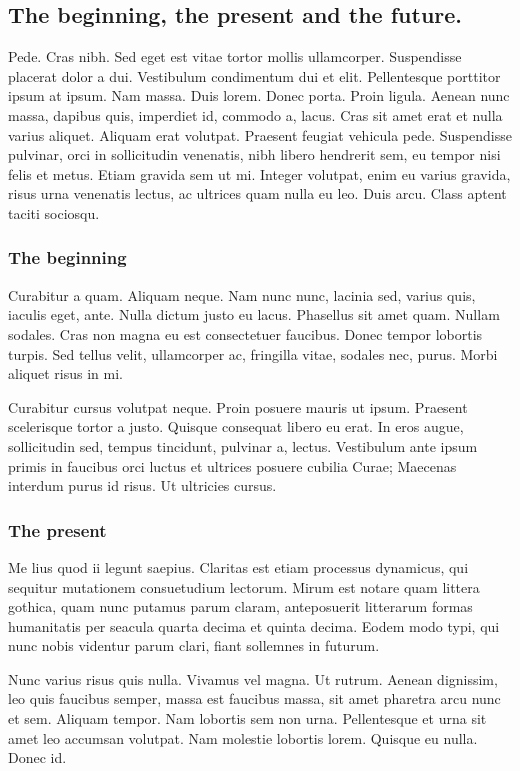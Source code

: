 \subsection*{The beginning, the present and the future.}

Pede. Cras nibh. Sed eget est vitae tortor mollis ullamcorper. Suspendisse
placerat dolor a dui. Vestibulum condimentum dui et elit. Pellentesque
porttitor ipsum at ipsum. Nam massa. Duis lorem. Donec porta. Proin ligula.
Aenean nunc massa, dapibus quis, imperdiet id, commodo a, lacus. Cras sit amet
erat et nulla varius aliquet. Aliquam erat volutpat. Praesent feugiat vehicula
pede. Suspendisse pulvinar, orci in sollicitudin venenatis, nibh libero
hendrerit sem, eu tempor nisi felis et metus. Etiam gravida sem ut mi. Integer
volutpat, enim eu varius gravida, risus urna venenatis lectus, ac ultrices quam
nulla eu leo. Duis arcu. Class aptent taciti sociosqu.


\subsubsection*{The beginning}

Curabitur a quam. Aliquam neque. Nam nunc nunc, lacinia sed, varius quis,
iaculis eget, ante. Nulla dictum justo eu lacus. Phasellus sit amet quam.
Nullam sodales. Cras non magna eu est consectetuer faucibus. Donec tempor
lobortis turpis. Sed tellus velit, ullamcorper ac, fringilla vitae, sodales
nec, purus. Morbi aliquet risus in mi.

Curabitur cursus volutpat neque. Proin posuere mauris ut ipsum. Praesent
scelerisque tortor a justo. Quisque consequat libero eu erat. In eros augue,
sollicitudin sed, tempus tincidunt, pulvinar a, lectus. Vestibulum ante ipsum
primis in faucibus orci luctus et ultrices posuere cubilia Curae; Maecenas
interdum purus id risus. Ut ultricies cursus.


\subsubsection*{The present}

Me lius quod ii legunt saepius. Claritas est etiam processus dynamicus, qui
sequitur mutationem consuetudium lectorum. Mirum est notare quam littera
gothica, quam nunc putamus parum claram, anteposuerit litterarum formas
humanitatis per seacula quarta decima et quinta decima. Eodem modo typi, qui
nunc nobis videntur parum clari, fiant sollemnes in futurum.

Nunc varius risus quis nulla. Vivamus vel magna. Ut rutrum. Aenean dignissim,
leo quis faucibus semper, massa est faucibus massa, sit amet pharetra arcu nunc
et sem. Aliquam tempor. Nam lobortis sem non urna. Pellentesque et urna sit
amet leo accumsan volutpat. Nam molestie lobortis lorem. Quisque eu nulla.
Donec id.

